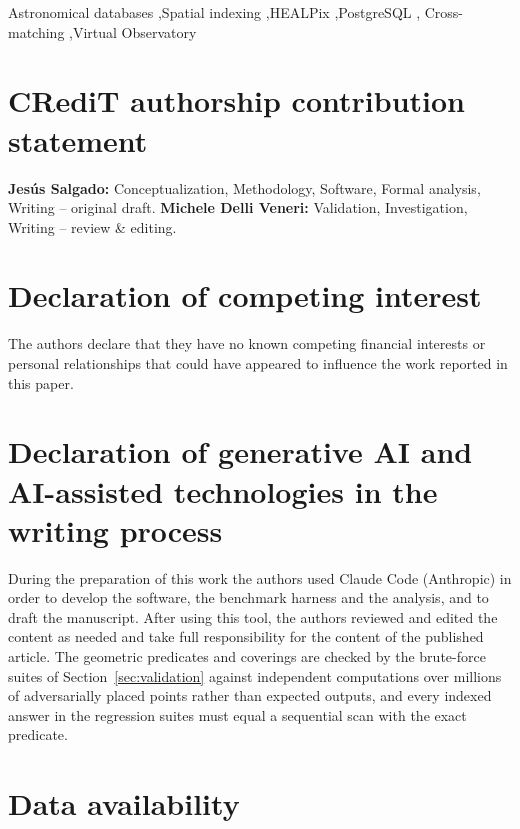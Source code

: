 \documentclass[final,5p,times,twocolumn,authoryear]{elsarticle}
\begin{document}
\begin{frontmatter}
\begin{keyword}
Astronomical databases \sep Spatial indexing \sep HEALPix \sep PostgreSQL \sep
Cross-matching \sep Virtual Observatory
\end{keyword}

\end{frontmatter}



\section*{CRediT authorship contribution statement}

\textbf{Jes\'us Salgado:} Conceptualization, Methodology, Software, Formal analysis,
Writing -- original draft. \textbf{Michele Delli Veneri:} Validation, Investigation,
Writing -- review \& editing.

\section*{Declaration of competing interest}

The authors declare that they have no known competing financial interests or personal
relationships that could have appeared to influence the work reported in this paper.

\section*{Declaration of generative AI and AI-assisted technologies in the writing process}

During the preparation of this work the authors used Claude Code (Anthropic) in order to
develop the software, the benchmark harness and the analysis, and to draft the
manuscript. After using this tool, the authors reviewed and edited the content as needed
and take full responsibility for the content of the published article. The geometric
predicates and coverings are checked by the brute-force suites of
Section~\ref{sec:validation} against independent computations over millions of
adversarially placed points rather than expected outputs, and every indexed answer in the
regression suites must equal a sequential scan with the exact predicate.

\section*{Data availability}
\end{document}
